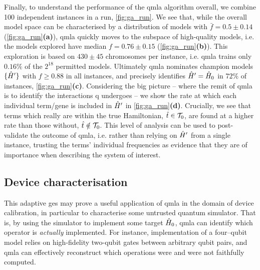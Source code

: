 Finally, to understand the performance of the \gls{qmla} algorithm overall, 
    we combine 100 independent \glspl{instance} in a \gls{run}, \cref{fig:ga_run}. 
We see that, while the overall \gls{model space} can be characterised by a distribution 
    of models with $\bar{f} = 0.5 \pm 0.14$ (\cref{fig:ga_run}\textbf{(a)}), 
    \gls{qmla} quickly moves to the subspace of high-quality models, 
    i.e. the models explored have median $f = 0.76 \pm 0.15$ (\cref{fig:ga_run}\textbf{(b)}).
This exploration is based on $430 \pm 45$ chromosomes per instance, 
    i.e. \gls{qmla} trains only $0.16\%$ of the $2^{18}$ permitted models. 
Ultimately \gls{qmla} nominates \glspl{champion model} $\{ \hat{H}^{\prime} \}$ with $f \geq 0.88$ in all instances, 
    and precisely identifies $\hat{H}^{\prime}=\hat{H}_0$ in $72\%$ of instances, \cref{fig:ga_run}\textbf{(c)}. 
Considering the big picture 
    -- where the remit of \gls{qmla} is to identify the interactions \gls{q} undergoes -- 
    we show the rate at which each individual term/gene is included in $\hat{H}^{\prime}$ in 
    \cref{fig:ga_run}\textbf{(d)}. 
Crucially, we see that terms which really are within the true Hamiltonian, $\hat{t} \in \mathcal{T}_0$, 
    are found at a higher rate than those without, $\hat{t} \notin \mathcal{T}_0$. 
This level of analysis can be used to post-validate the outcome of \gls{qmla}, 
    i.e. rather than relying on $\hat{H}^{\prime}$ from a single instance, 
    trusting the terms' individual frequencies as evidence that they are of importance when describing 
    the system of interest. 

\subsection{Device characterisation}
This adaptive \gls{ges} may prove a useful application of \gls{qmla} in the domain of device calibration,
    in particular to characterise some untrusted quantum simulator.
That is, by using the simulator to implement some target $\hat{H}_0$, 
    \gls{qmla} can identify which operator is \emph{actually} implemented.
For instance, implementation of a four--qubit model
    relies on high-fidelity two-qubit gates between arbitrary qubit pairs, 
    and \gls{qmla} can effectively reconstruct which operations were and were not faithfully computed.
